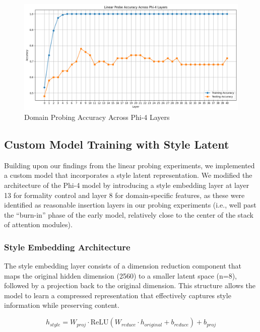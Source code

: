 \documentclass[twocolumn]{article}
\begin{document}
\begin{figure}
    \centering
    \includegraphics[width=1.0\textwidth]{figures/3_domain.png}
    \caption{Domain Probing Accuracy Across Phi-4 Layers}
    \label{fig:domain-accuracy}
\end{figure}

\subsection{Custom Model Training with Style Latent}

Building upon our findings from the linear probing experiments, we implemented a custom model that incorporates a style latent representation. We modified the architecture of the Phi-4 model by introducing a style embedding layer at layer 13 for formality control and layer 8 for domain-specific features, as these were identified as reasonable insertion layers in our probing experiments (i.e., well past the ``burn-in'' phase of the early model, relatively close to the center of the stack of attention modules).

\subsubsection{Style Embedding Architecture}
The style embedding layer consists of a dimension reduction component that maps the original hidden dimension (2560) to a smaller latent space (n=8), followed by a projection back to the original dimension. This structure allows the model to learn a compressed representation that effectively captures style information while preserving content.

\begin{equation}
h_{style} = W_{proj} \cdot \text{ReLU}(W_{reduce} \cdot h_{original} + b_{reduce}) + b_{proj}
\end{equation}
\end{document}
